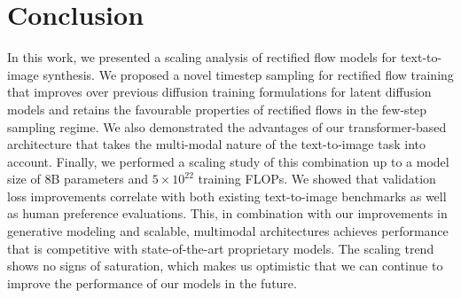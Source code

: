 \section{Conclusion}
\label{sec:conclusion}
In this work, we presented a scaling analysis of rectified flow models for
text-to-image synthesis. We proposed a novel timestep sampling for rectified
flow training that improves over previous diffusion training formulations for
latent diffusion models and retains the favourable properties of rectified
flows in the few-step sampling regime. We also demonstrated the advantages of
our transformer-based \modelname architecture that takes the multi-modal nature of the
text-to-image task into account. Finally, we performed a scaling study of this
combination up to a model size of 8B parameters and $5\times 10^{22}$ training
FLOPs. We showed that validation loss improvements correlate with both existing
text-to-image benchmarks as well as human preference evaluations. This, in
combination with our improvements in generative modeling and scalable, multimodal
architectures achieves performance that is competitive with state-of-the-art
proprietary models. 
The scaling trend shows no signs of saturation, which makes us optimistic
that we can continue to improve the performance of our models in the future.
%
%
